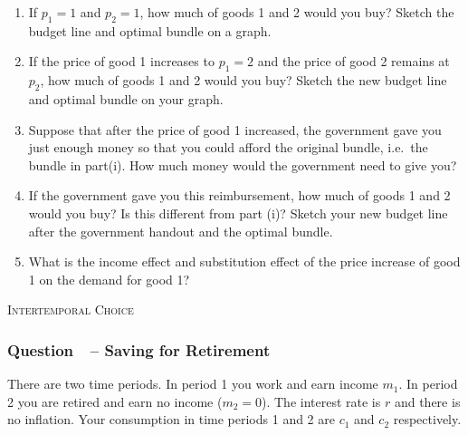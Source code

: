 \documentclass[12pt]{article}
\newcommand{\topic}[1]{\medskip\begin{center}\large\textsc{#1}\normalsize
  \end{center}}
\newcounter{question}[section]
\newcommand{\question}[1]{\refstepcounter{question}
  \subsubsection*{Question~\thequestion~-- #1}}
\newenvironment{subquestions}{
  \begin{enumerate}[label=(\roman*)]}{\end{enumerate}}
\begin{document}
\begin{subquestions}
\item If $p_1=1$ and $p_2=1$, how much of goods 1 and 2 would you buy? Sketch the budget line and optimal bundle on a graph.
\item If the price of good 1 increases to $p_1=2$ and the price of good 2 remains at $p_2$, how much of goods 1 and 2 would you buy? Sketch the new budget line and optimal bundle on your graph.
  \item Suppose that after the price of good 1 increased, the government gave you just enough money so that you could afford the original bundle, i.e.~the bundle in part(i). How much money would the government need to give you?
  \item If the government gave you this reimbursement, how much of goods 1 and 2 would you buy? Is this different from part (i)? Sketch your new budget line after the government handout and the optimal bundle.
  \item What is the income effect and substitution effect of the price increase of good 1 on the demand for good 1?
\end{subquestions}

\topic{Intertemporal Choice}
\question{Saving for Retirement}
There are two time periods. In period 1 you work and earn income $m_1$. In
period 2 you are retired and earn no income ($m_2=0$). The interest rate is $r$
and there is no inflation. Your consumption in time periods 1 and 2 are $c_1$
and $c_2$ respectively.
\end{document}
